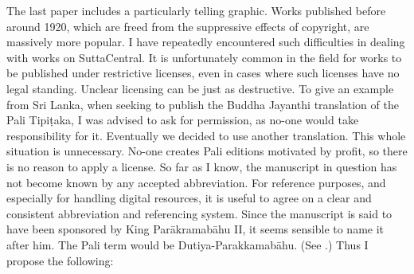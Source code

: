\markdownRendererBlockQuoteEnd \markdownRendererInterblockSeparator
{}The last paper includes a particularly telling graphic. Works published before around 1920, which are freed from the suppressive effects of copyright, are massively more popular.\markdownRendererInterblockSeparator
{}\markdownRendererInterblockSeparator
{}I have repeatedly encountered such difficulties in dealing with works on SuttaCentral. It is unfortunately common in the field for works to be published under restrictive licenses, even in cases where such licenses have no legal standing. Unclear licensing can be just as destructive. To give an example from Sri Lanka, when seeking to publish the Buddha Jayanthi translation of the Pali Tipiṭaka, I was advised  to ask for permission, as no-one would take responsibility for it. Eventually we decided to use another translation.\markdownRendererInterblockSeparator
{}This whole situation is unnecessary. No-one creates Pali editions motivated by profit, so there is no reason to apply a license.\markdownRendererInterblockSeparator
{}\markdownRendererBlockQuoteBegin
{}
\markdownRendererBlockQuoteEnd \markdownRendererInterblockSeparator
{}\markdownRendererInterblockSeparator
{}So far as I know, the manuscript in question has not become known by any accepted abbreviation. For reference purposes, and especially for handling digital resources, it is useful to agree on a clear and consistent abbreviation and referencing system.\markdownRendererInterblockSeparator
{}\markdownRendererInterblockSeparator
{}Since the manuscript is said to have been sponsored by King Parākramabāhu II, it seems sensible to name it after him. The Pali term would be Dutiya-Parakkamabāhu. (See  .) Thus I propose the following:\markdownRendererInterblockSeparator
{}\markdownRendererBlockQuoteBegin
{}
